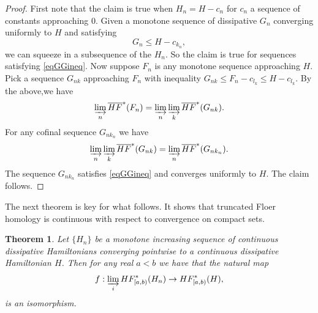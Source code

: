\documentclass[11pt]{amsart}
\newtheorem{tm}{Theorem}[section]
\theoremstyle{definition}
\theoremstyle{remark}
\begin{document}
\begin{proof}
First note that the claim is true when $H_n=H-c_n$ for $c_n$ a sequence of constants approaching $0$. Given a monotone sequence of dissipative $G_n$ converging uniformly to $H$ and satisfying
\begin{equation}\label{eqGGineq}
G_n\leq H-c_{k_n},
\end{equation}
 we can squeeze in a subsequence of the $H_n$. So the claim is true for sequences satisfying \eqref{eqGGineq}. Now suppose $F_n$ is any monotone sequence approaching $H$. Pick a sequence $G_{nk}$ approaching $F_n$ with inequality $G_{nk}\leq F_n-c_{l_k}\leq H-c_{l_k}$. By the above,we have
  \[
  \varinjlim_n \overline{HF}^*(F_n)=\varinjlim_n\varinjlim_k \overline{HF}^*(G_{nk}).
  \]
For any cofinal sequence $G_{nk_n}$ we have
\[
\varinjlim_n\varinjlim_k \overline{HF}^*(G_{nk})=\varinjlim_n \overline{HF}^*(G_{nk_n}).
\]
The sequence $G_{nk_n}$ satisfies \eqref{eqGGineq} and converges uniformly to $H$. The claim follows.
\end{proof}
The next theorem is key for what follows. It shows that truncated Floer homology is continuous with respect to convergence on compact sets.
\begin{tm}\label{lmConstApp}
Let $\{H_n\}$ be a monotone increasing sequence of continuous dissipative Hamiltonians converging pointwise to a continuous dissipative Hamiltonian $H$.  Then for any real $a<b$ we have that the natural map
\[
f:\varinjlim_{i}HF^*_{[a,b)}(H_n)\to HF^*_{[a,b)}(H),
\]
is an isomorphism.
\end{tm}
\end{document}
